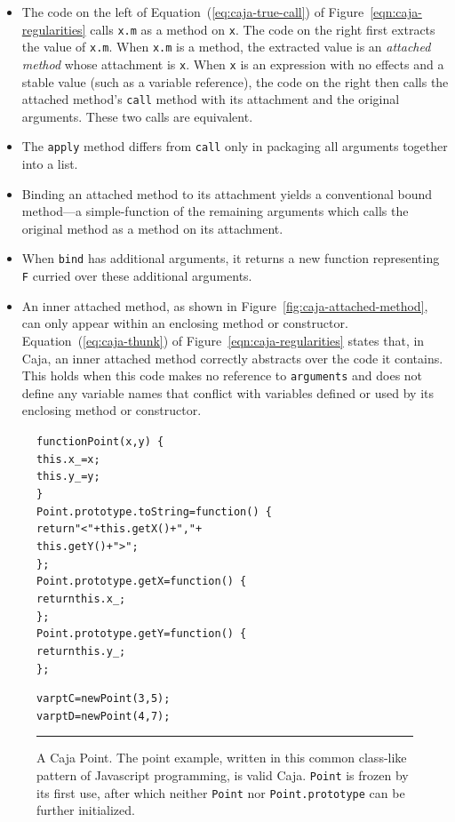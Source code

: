\documentclass[letterpaper,twocolumn,10pt]{article}
\newcommand{\code}[1]{{\tt {#1}}}              %
\begin{document}
\begin{itemize}

  \item The code on the left of Equation~(\ref{eq:caja-true-call}) of Figure~\ref{eqn:caja-regularities} calls
  \code{x.m} as a method on \code{x}. The code on the right first extracts the value of \code{x.m}. When \code{x.m} 
  is a method, the extracted value is an \emph{attached method} whose attachment is \code{x}. When \code{x} is an 
  expression with no effects and a stable value (such as a variable reference), the code on the right then calls the 
  attached method's \code{call} method with its attachment and the original arguments. These two calls are equivalent.
  
  \item The \code{apply} method differs from \code{call} only in packaging all arguments together into a list.
  
  \item Binding an attached method to its attachment yields a conventional bound method---a simple-function of the 
  remaining arguments which calls the original method as a method on its attachment.
  
  \item When \code{bind} has additional arguments, it returns a new function representing \code{F} curried over these 
  additional arguments.
  
  \item An inner attached method, as shown in Figure~\ref{fig:caja-attached-method}, can only appear within an 
  enclosing method or constructor. Equation~(\ref{eq:caja-thunk}) of Figure~\ref{eqn:caja-regularities} states that, 
  in Caja, an inner attached method correctly abstracts over the code it contains. This holds when this code makes no 
  reference to \code{arguments} and does not define any variable names that conflict with variables defined or used 
  by its enclosing method or constructor.

\end{itemize}


\begin{figure}[t!]
\begin{alltt}
function Point(x, y)\ \{
  this.x\_ = x;
  this.y\_ = y;
\}
Point.prototype.toString = function()\ \{ 
  return "<" + this.getX() + "," + 
               this.getY() + ">"; 
\};
Point.prototype.getX = function()\ \{ 
  return this.x\_; 
\};
Point.prototype.getY = function()\ \{ 
  return this.y\_;
\};

var ptC = new Point(3, 5);
var ptD = new Point(4, 7);
\end{alltt}

\caption[A Caja Point.]{A Caja Point. The point example, written in this common class-like pattern of Javascript 
programming, is valid Caja. \code{Point} is frozen by its first use, after which neither \code{Point} nor 
\code{Point.prototype} can be further initialized. \\ } \hrule
\label{fig:caja-point}
\end{figure}
\end{document}
